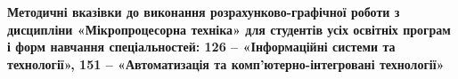 \begin{titlepage}
\onespace
\begin{center}
\Large{\textbf{\vfill Методичні вказівки до виконання розрахунково-графічної роботи з дисципліни «Мікропроцесорна техніка» для студентів усіх освітніх програм і форм навчання спеціальностей: 126 -- «Інформаційні системи та технології», 151 -- «Автоматизація та комп’ютерно-інтегровані технології»}}
\vfill
\newpage
\end{center}
\end{titlepage}